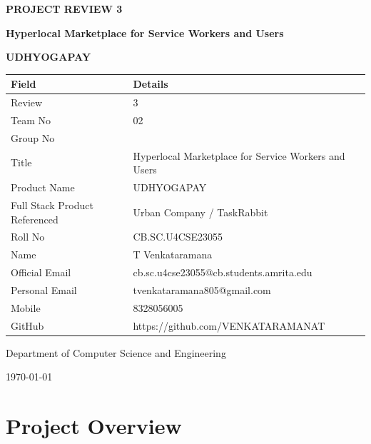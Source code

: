 \documentclass[12pt,a4paper]{article}
\begin{document}
\begin{titlepage}
    \centering
    \vspace*{2cm}
    
    {\Huge\bfseries PROJECT REVIEW 3\par}
    \vspace{1cm}
    {\LARGE\bfseries Hyperlocal Marketplace for Service Workers and Users\par}
    \vspace{0.5cm}
    {\Large\textbf{UDHYOGAPAY}\par}
    
    \vspace{2cm}
    
    \begin{tabular}{|p{5cm}|p{8cm}|}
    \hline
    \rowcolor{lightgray}
    \textbf{Field} & \textbf{Details} \\
    \hline
    Review & 3 \\
    \hline
    Team No & 02 \\
    \hline
    Group No & ~~ \\
    \hline
    Title & Hyperlocal Marketplace for Service Workers and Users \\
    \hline
    Product Name & UDHYOGAPAY \\
    \hline
    Full Stack Product Referenced & Urban Company / TaskRabbit \\
    \hline
    Roll No & CB.SC.U4CSE23055 \\
    \hline
    Name & T Venkataramana \\
    \hline
    Official Email & cb.sc.u4cse23055@cb.students.amrita.edu \\
    \hline
    Personal Email & tvenkataramana805@gmail.com \\
    \hline
    Mobile & 8328056005 \\
    \hline
    GitHub & https://github.com/VENKATARAMANAT \\
    \hline
    \end{tabular}
    
    \vfill
    
    {\large Department of Computer Science and Engineering\par}
    {\large \today\par}
\end{titlepage}

\newpage

\section*{Project Overview}
\end{document}
